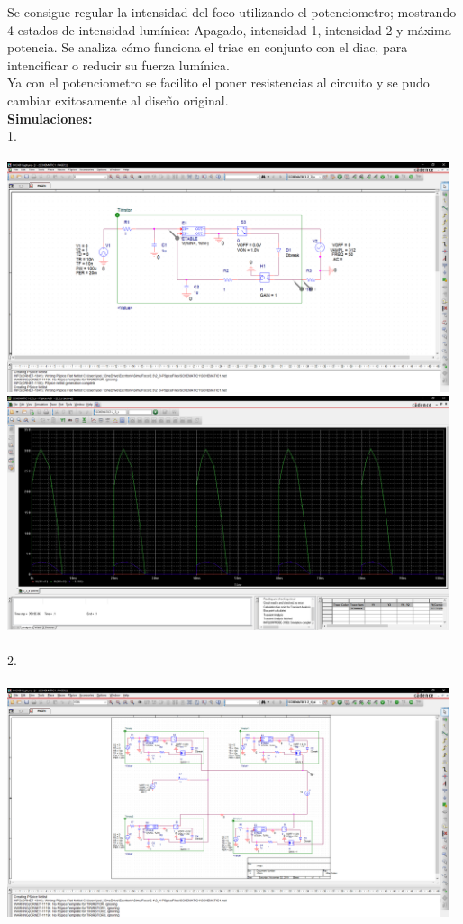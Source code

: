 \documentclass[letterpaper]{article}
\begin{document}
\begin{large}
    Se consigue regular la intensidad del foco utilizando el potenciometro; mostrando 4 estados de intensidad lumínica: Apagado, intensidad 1, intensidad 2 y máxima potencia. Se analiza cómo funciona el triac en conjunto con el diac, para intencificar o reducir su fuerza lumínica.\\
    Ya con el potenciometro se facilito el poner resistencias al circuito y se pudo cambiar exitosamente al diseño original.\\
    \newpage
    \textbf{Simulaciones:}\\
    1.\\\\
    \includegraphics[width=13cm]{img/Sim/1.png}\\
    \includegraphics[width=13cm]{img/Sim/11.png}\\\\
    2.\\\\
    \includegraphics[width=13cm]{img/Sim/2.png}\\

\end{large}
\end{document}
